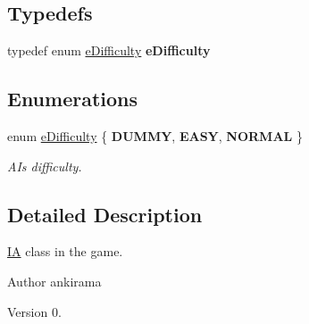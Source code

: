\subsection*{Typedefs}
\begin{DoxyCompactItemize}
\item 
\hypertarget{_i_a_8hh_a03c5290cc24ae3c7b8691a9b59e8733f}{}typedef enum \hyperlink{_i_a_8hh_a401e35a5e652326cb9a2e566ca8908a7}{e\+Difficulty} {\bfseries e\+Difficulty}\label{_i_a_8hh_a03c5290cc24ae3c7b8691a9b59e8733f}

\end{DoxyCompactItemize}
\subsection*{Enumerations}
\begin{DoxyCompactItemize}
\item 
\hypertarget{_i_a_8hh_a401e35a5e652326cb9a2e566ca8908a7}{}enum \hyperlink{_i_a_8hh_a401e35a5e652326cb9a2e566ca8908a7}{e\+Difficulty} \{ {\bfseries D\+U\+M\+M\+Y}, 
{\bfseries E\+A\+S\+Y}, 
{\bfseries N\+O\+R\+M\+A\+L}
 \}\label{_i_a_8hh_a401e35a5e652326cb9a2e566ca8908a7}

\begin{DoxyCompactList}\small\item\em A\+I\textquotesingle{}s difficulty. \end{DoxyCompactList}\end{DoxyCompactItemize}


\subsection{Detailed Description}
\hyperlink{class_i_a}{I\+A} class in the game. 

\begin{DoxyAuthor}{Author}
ankirama 
\end{DoxyAuthor}
\begin{DoxyVersion}{Version}
0. 
\end{DoxyVersion}
